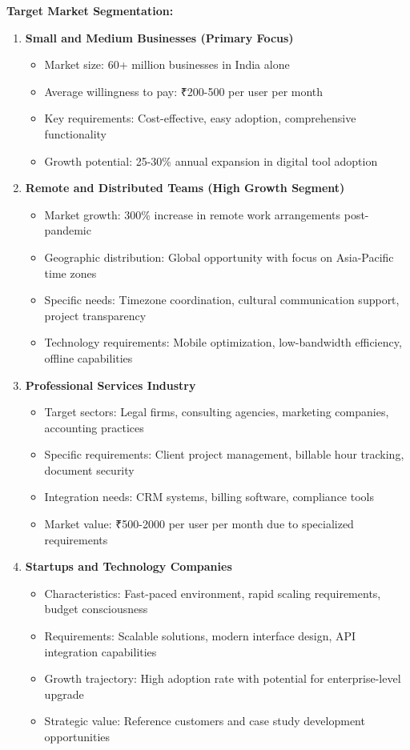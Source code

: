 \textbf{Target Market Segmentation:}
\begin{enumerate}
    \item \textbf{Small and Medium Businesses (Primary Focus)}
    \begin{itemize}
        \item Market size: 60+ million businesses in India alone
        \item Average willingness to pay: ₹200-500 per user per month
        \item Key requirements: Cost-effective, easy adoption, comprehensive functionality
        \item Growth potential: 25-30\% annual expansion in digital tool adoption
    \end{itemize}
    \item \textbf{Remote and Distributed Teams (High Growth Segment)}
    \begin{itemize}
        \item Market growth: 300\% increase in remote work arrangements post-pandemic
        \item Geographic distribution: Global opportunity with focus on Asia-Pacific time zones
        \item Specific needs: Timezone coordination, cultural communication support, project transparency
        \item Technology requirements: Mobile optimization, low-bandwidth efficiency, offline capabilities
    \end{itemize}
    \item \textbf{Professional Services Industry}
    \begin{itemize}
        \item Target sectors: Legal firms, consulting agencies, marketing companies, accounting practices
        \item Specific requirements: Client project management, billable hour tracking, document security
        \item Integration needs: CRM systems, billing software, compliance tools
        \item Market value: ₹500-2000 per user per month due to specialized requirements
    \end{itemize}
    \item \textbf{Startups and Technology Companies}
    \begin{itemize}
        \item Characteristics: Fast-paced environment, rapid scaling requirements, budget consciousness
        \item Requirements: Scalable solutions, modern interface design, API integration capabilities
        \item Growth trajectory: High adoption rate with potential for enterprise-level upgrade
        \item Strategic value: Reference customers and case study development opportunities
    \end{itemize}
\end{enumerate}

